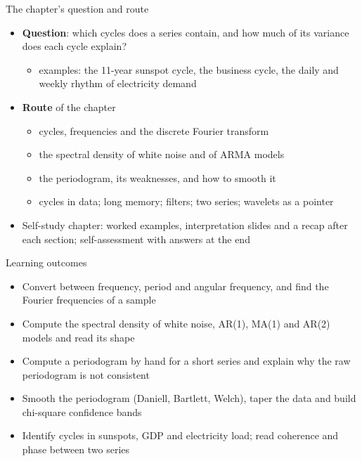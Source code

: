 \begin{frame}{The chapter's question and route}
\itemsize{\small}
\begin{itemize}
    \item \textbf{Question}: which cycles does a series contain, and how much of its variance does each cycle explain?
    \begin{itemize}
        \item examples: the 11-year sunspot cycle, the business cycle, the daily and weekly rhythm of electricity demand
    \end{itemize}
    \item \textbf{Route} of the chapter
    \begin{itemize}
        \item cycles, frequencies and the discrete Fourier transform
        \item the spectral density of white noise and of ARMA models
        \item the periodogram, its weaknesses, and how to smooth it
        \item cycles in data; long memory; filters; two series; wavelets as a pointer
    \end{itemize}
    \item Self-study chapter: worked examples, interpretation slides and a recap after each section; self-assessment with answers at the end
\end{itemize}
\end{frame}

\begin{frame}{Learning outcomes}
\itemsize{\small}
\begin{itemize}
    \item Convert between frequency, period and angular frequency, and find the Fourier frequencies of a sample
    \item Compute the spectral density of white noise, AR(1), MA(1) and AR(2) models and read its shape
    \item Compute a periodogram by hand for a short series and explain why the raw periodogram is not consistent
    \item Smooth the periodogram (Daniell, Bartlett, Welch), taper the data and build chi-square confidence bands
    \item Identify cycles in sunspots, GDP and electricity load; read coherence and phase between two series
\end{itemize}
\end{frame}

